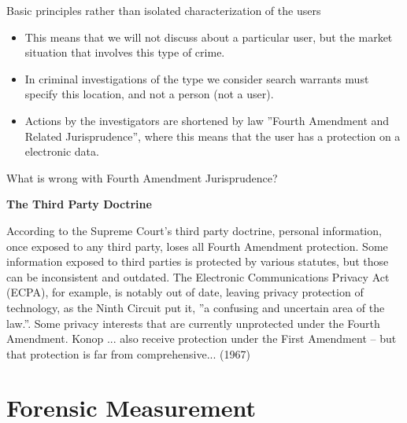 \documentclass[notes]{beamer}
\begin{document}
\begin{frame}
\begin{block}{Basic principles rather than isolated characterization of the users}

\begin{itemize}

\item[\checkmark]This means that we will not discuss about a particular user, but the market situation that involves this type of crime.

\item[\checkmark]In criminal investigations of the type we consider search warrants must specify this location, and not a person (not a user).

\item[\checkmark]Actions by the investigators are shortened by law ''Fourth Amendment and Related Jurisprudence'', where this means that the user has a protection on a electronic data.

\end{itemize}

\end{block}

\end{frame}

\begin{frame}
\begin{block}{What is wrong with Fourth Amendment Jurisprudence?}

\textbf{The Third Party Doctrine}
 
According to the Supreme Court's third party doctrine, personal information, once exposed to any third party, loses all Fourth Amendment protection. Some information exposed to third parties is protected by various statutes, but those can be inconsistent and outdated. The Electronic Communications Privacy Act (ECPA), for example, is notably out of date, leaving privacy protection of technology, as the Ninth Circuit put it, ''a confusing and uncertain area of the law.''. Some privacy interests that are currently unprotected under the Fourth Amendment. Konop ... also receive protection under the First Amendment – but that protection is far from comprehensive... (1967)

\end{block}

\end{frame}

\section{Forensic Measurement}
\begin{frame}

\end{frame}
\end{document}
